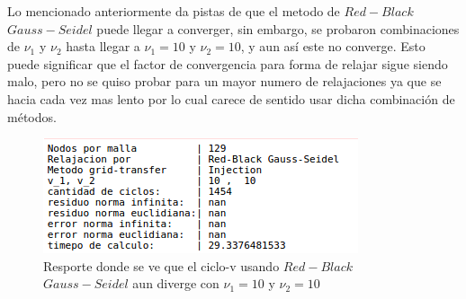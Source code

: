 \documentclass[letter,10pt]{article}
\begin{document}
\indent Lo mencionado anteriormente da pistas de que el metodo de $Red-Black$ $Gauss-Seidel$ puede llegar a converger, sin embargo, se probaron combinaciones de $\nu_1$ y $\nu_2$ hasta llegar a $\nu_1=10$ y $\nu_2=10$, y aun así este no converge. Esto puede significar que el factor de convergencia para forma de relajar sigue siendo malo, pero no se quiso probar para un mayor numero de relajaciones ya que se hacia cada vez mas lento por lo cual carece de sentido usar dicha combinación de métodos.

\begin{figure}[H]
\centering
\includegraphics[scale=1]{img/reportefmg/reportevcrbgsin129}
\caption{Resporte donde se ve que el ciclo-v usando $Red-Black$ $Gauss-Seidel$ aun diverge con $\nu_1=10$ y $\nu_2=10$}
\label{reporterbgs129in}
\end{figure}
\end{document}
